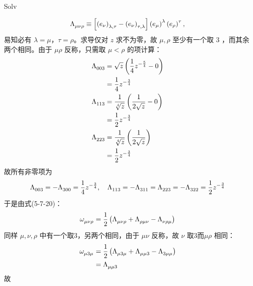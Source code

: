 \begin{xiti}
\begin{jie}
\begin{enumerate}
\begin{yl}{Solv}
\begin{enumerate}[leftmargin=2em]
\begin{displaymath}
	        	    \tensor{\Lambda}{_\mu_\nu_\rho} \equiv \left[ \tensor{\left(e_\nu\right)}{_{\lambda,\tau}} - \tensor{\left(e_\nu\right)}{_{\tau,\lambda}} \right] \tensor{\left(e_\mu\right)}{^\lambda} \tensor{\left(e_\rho\right)}{^\tau},
	        	    \end{displaymath}
	        	    易知必有 $\lambda=\mu$，$\tau=\rho$。求导仅对 $z$ 求不为零，故 $\mu,\rho$ 至少有一个取 $3$ ，而其余两个相同。由于 $\mu\rho$ 反称，只需取 $\mu<\rho$ 的项计算：
	        	    \begin{align*}
	        	    \tensor{\Lambda}{_0_0_3} &= \sqrt{z} \left( \frac{1}{4} z^{-\frac{5}{4}} - 0 \right)\\
	        	    &= \frac{1}{4} z^{-\frac{3}{4}}\\
	        	    \tensor{\Lambda}{_1_1_3} &= \frac{1}{\sqrt[4]{z}} \left( \frac{1}{2\sqrt{z}} - 0 \right)\\
	        	    &= \frac{1}{2} z^{-\frac{3}{4}}\\
	        	    \tensor{\Lambda}{_2_2_3} &= \frac{1}{\sqrt[4]{z}} \left( \frac{1}{2\sqrt{z}} \right)\\
	        	    &= \frac{1}{2} z^{-\frac{3}{4}}
	        	    \end{align*}
	        	    故所有非零项为
	        	    \begin{displaymath}
	        	    \tensor{\Lambda}{_0_0_3} = - \tensor{\Lambda}{_3_0_0} = \frac{1}{4} z^{-\frac{3}{4}} \qc
	        	    \tensor{\Lambda}{_1_1_3} = - \tensor{\Lambda}{_3_1_1} = \tensor{\Lambda}{_2_2_3} = - \tensor{\Lambda}{_3_2_2} = \frac{1}{2} z^{-\frac{3}{4}}
	        	    \end{displaymath}
	        	    于是由式(5-7-20)：
	        	    \begin{displaymath}
	        	    \tensor{\omega}{_\mu_\nu_\rho} = \frac{1}{2} \left( \tensor{\Lambda}{_\mu_\nu_\rho} + \tensor{\Lambda}{_\rho_\mu_\nu} - \tensor{\Lambda}{_\nu_\rho_\mu} \right)
	        	    \end{displaymath}
	        	    同样 $\mu,\nu,\rho$ 中有一个取3，另两个相同，由于 $\mu\nu$ 反称，故 $\nu$ 取3而$\mu\rho$ 相同：
	        	    \begin{align*}
	        	    \tensor{\omega}{_\mu_3_\mu} &= \frac{1}{2} \left( \tensor{\Lambda}{_\mu_3_\mu} + \tensor{\Lambda}{_\mu_\mu_3} - \tensor{\Lambda}{_3_\mu_\mu} \right)\\
	        	    &= \tensor{\Lambda}{_\mu_\mu_3}
	        	    \end{align*}
	        	    故
	        	    \begin{displaymath}

\end{displaymath}
\end{enumerate}
\end{yl}
\end{enumerate}
\end{jie}
\end{xiti}

